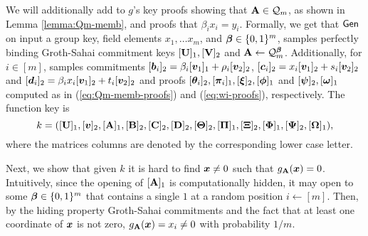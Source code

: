 We will additionally add to $g$'s key proofs showing that $\mathbf{{A}}\in\mathcal{Q}_m$, as shown in Lemma \ref{lemma:Qm-memb}, and proofs that $\beta_ix_i = y_i$. Formally, we get that $\mathsf{Gen}$ on input a group key, field elements $x_1,\ldots x_m$, and ${\boldsymbol{\beta}}\in\{0,1\}^m$, samples perfectly binding Groth-Sahai commitment keys $[\mathbf{{U}}]_1,[\mathbf{{V}}]_2$ and $\mathbf{{A}}\gets\mathcal{Q}_m^{\boldsymbol{\beta}}$. Additionally, for $i\in[m]$, samples commitments $[{\boldsymbol{b}}_i]_2 = \beta_i[{\boldsymbol{v}}_1]_1+\rho_i[{\boldsymbol{v}}_2]_2$, $[{\boldsymbol{c}}_i]_2  = x_i[{\boldsymbol{v}}_1]_2+s_i[{\boldsymbol{v}}_2]_2$ and $[{\boldsymbol{d}}_i]_2  = \beta_ix_i[{\boldsymbol{v}}_1]_2+t_i[{\boldsymbol{v}}_2]_2$ and proofs $[{\boldsymbol{\theta}}_i]_2,[{\boldsymbol{\pi}}_i]_1,[{\boldsymbol{\xi}}]_2,[{\boldsymbol{\phi}}]_1$ and $[{\boldsymbol{\psi}}]_2,[{\boldsymbol{\omega}}]_1$ computed as in (\ref{eq:Qm-memb-proofs}) and (\ref{eq:wi-proofs}), respectively. The function key is
$$
k = ([\mathbf{{U}}]_1,[{\boldsymbol{v}}]_2,[\mathbf{{A}}]_1,[\mathbf{{B}}]_2,[\mathbf{{C}}]_2,[\mathbf{{D}}]_2,[\mathbf{{\Theta}}]_2,[\mathbf{{\Pi}}]_1,
[\mathbf{{\Xi}}]_2,[\mathbf{{\Phi}}]_1,[\mathbf{{\Psi}}]_2,[\mathbf{{\Omega}}]_1),
$$
where the matrices columns are denoted by the corresponding lower case letter.

Next, we show that given $k$  it is hard to find ${\boldsymbol{x}}\neq 0$ such that $g_{\mathbf{{A}}}({\boldsymbol{x}})=0$. Intuitively, since the opening of $[\mathbf{{A}}]_1$ is computationally hidden, it  may open to some ${\boldsymbol{\beta}}\in\{0,1\}^m$ that contains a single $1$ at a random position $i\gets[m]$. Then, by the hiding property Groth-Sahai commitments and the fact that at least one coordinate of ${\boldsymbol{x}}$ is not zero, $g_{\mathbf{{A}}}({\boldsymbol{x}}) = x_i\neq 0$ with probability $1/m$. 

